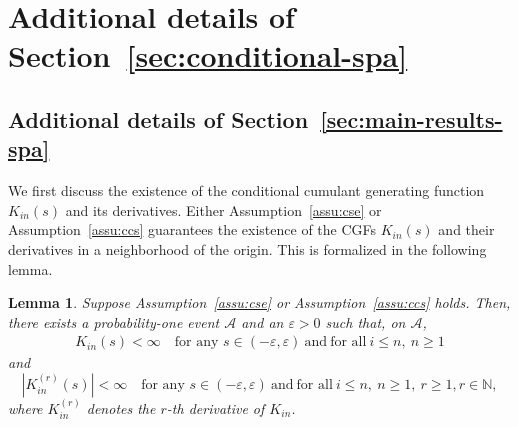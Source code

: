 \documentclass[12pt]{article}
\newtheorem{lemma}{Lemma}
\theoremstyle{definition}
\begin{document}
\section{Additional details of Section~\ref{sec:conditional-spa}}

\subsection{Additional details of Section~\ref{sec:main-results-spa}}\label{sec:additional-details-spa}

We first discuss the existence of the conditional cumulant generating function $K_{in}(s)$ and its derivatives. Either Assumption~\ref{assu:cse} or Assumption~\ref{assu:ccs} guarantees the existence of the CGFs $K_{in}(s)$ and their derivatives in a neighborhood of the origin. This is formalized in the following lemma. 
\begin{lemma}\label{lem:finite_cgf}
Suppose Assumption~\ref{assu:cse} or Assumption~\ref{assu:ccs} holds. Then, there exists a probability-one event $\mathcal A$ and an $\varepsilon > 0$ such that, on $\mathcal A$,
\begin{align}
K_{in}(s) < \infty\quad \text{for any } s\in (-\varepsilon,\varepsilon)\ \text{and}\ \text{for all}\ i \leq n,\ n \geq 1 \label{eq:finite_cgf}
\end{align}
and 
\begin{equation}\label{eq:finite_cgf_derivatives}
	|K_{in}^{(r)}(s)| < \infty\quad \text{for any } s\in (-\varepsilon,\varepsilon)\ \text{and}\ \text{for all}\ i \leq n,\ n \geq 1, \ r \geq 1, r\in\mathbb{N},
\end{equation}
where $K_{in}^{(r)}$ denotes the $r$-th derivative of $K_{in}$.
\end{lemma}
\end{document}
